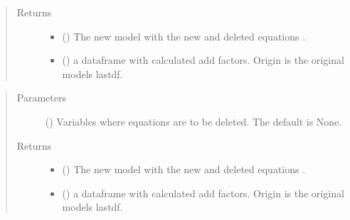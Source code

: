 \documentclass[letterpaper,10pt,english]{sphinxmanual}
\begin{document}
\begin{fulllineitems}
\begin{fulllineitems}
\begin{quote}
\begin{description}
\begin{itemize}
\end{itemize}

\item[{Returns}] \leavevmode
\sphinxAtStartPar
\begin{itemize}
\item {} 
\sphinxAtStartPar
{} () \textendash{} The new  model with the new and deleted equations .

\item {} 
\sphinxAtStartPar
{} () \textendash{} a dataframe with calculated add factors. Origin is the original models lastdf.

\end{itemize}


\end{description}\end{quote}

\end{fulllineitems}


\begin{fulllineitems}
\label{\detokenize{index:modelclass.Modify_Mixin.eqdelete}}
\pysigstartsignatures
{}
\pysigstopsignatures\begin{quote}\begin{description}
\item[{Parameters}] \leavevmode
\sphinxAtStartPar
{} (\sphinxstyleliteralemphasis{\sphinxupquote{, }}) \textendash{} Variables where equations are to be deleted. The default is None.

\item[{Returns}] \leavevmode
\sphinxAtStartPar
\begin{itemize}
\item {} 
\sphinxAtStartPar
{} () \textendash{} The new  model with the new and deleted equations .

\item {} 
\sphinxAtStartPar
{} () \textendash{} a dataframe with calculated add factors. Origin is the original models lastdf.


\end{itemize}
\end{description}
\end{quote}
\end{fulllineitems}
\end{fulllineitems}
\end{document}
